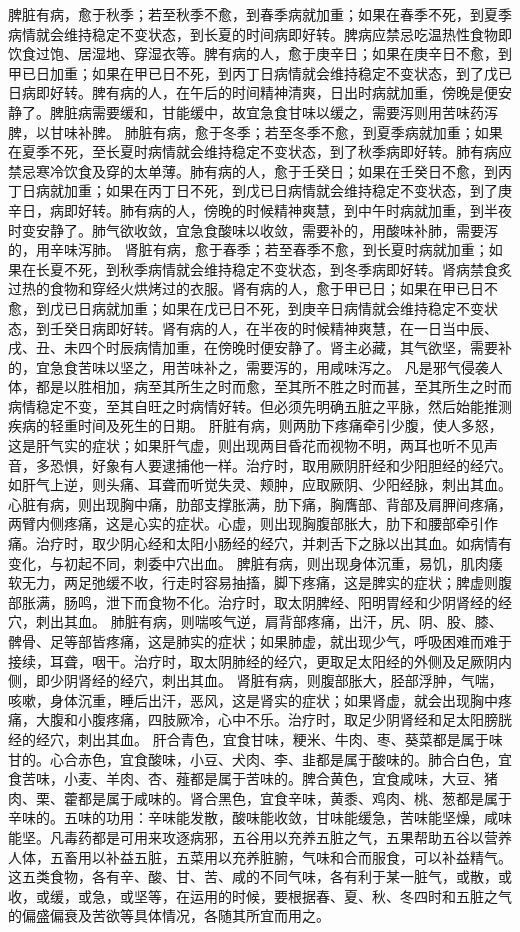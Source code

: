 \documentclass[a4paper,12pt,UTF8,twoside]{ctexbook}
\begin{document}
脾脏有病，愈于秋季；若至秋季不愈，到春季病就加重；如果在春季不死，到夏季病情就会维持稳定不变状态，到长夏的时间病即好转。脾病应禁忌吃温热性食物即饮食过饱、居湿地、穿湿衣等。脾有病的人，愈于庚辛日；如果在庚辛日不愈，到甲已日加重；如果在甲已日不死，到丙丁日病情就会维持稳定不变状态，到了戊已日病即好转。脾有病的人，在午后的时间精神清爽，日出时病就加重，傍晚是便安静了。脾脏病需要缓和，甘能缓中，故宜急食甘味以缓之，需要泻则用苦味药泻脾，以甘味补脾。
肺脏有病，愈于冬季；若至冬季不愈，到夏季病就加重；如果在夏季不死，至长夏时病情就会维持稳定不变状态，到了秋季病即好转。肺有病应禁忌寒冷饮食及穿的太单薄。肺有病的人，愈于壬癸日；如果在壬癸日不愈，到丙丁日病就加重；如果在丙丁日不死，到戊已日病情就会维持稳定不变状态，到了庚辛日，病即好转。肺有病的人，傍晚的时候精神爽慧，到中午时病就加重，到半夜时变安静了。肺气欲收敛，宜急食酸味以收敛，需要补的，用酸味补肺，需要泻的，用辛味泻肺。
肾脏有病，愈于春季；若至春季不愈，到长夏时病就加重；如果在长夏不死，到秋季病情就会维持稳定不变状态，到冬季病即好转。肾病禁食炙过热的食物和穿经火烘烤过的衣服。肾有病的人，愈于甲已日；如果在甲已日不愈，到戊已日病就加重；如果在戊已日不死，到庚辛日病情就会维持稳定不变状态，到壬癸日病即好转。肾有病的人，在半夜的时候精神爽慧，在一日当中辰、戌、丑、未四个时辰病情加重，在傍晚时便安静了。肾主必藏，其气欲坚，需要补的，宜急食苦味以坚之，用苦味补之，需要泻的，用咸味泻之。
凡是邪气侵袭人体，都是以胜相加，病至其所生之时而愈，至其所不胜之时而甚，至其所生之时而病情稳定不变，至其自旺之时病情好转。但必须先明确五脏之平脉，然后始能推测疾病的轻重时间及死生的日期。
肝脏有病，则两肋下疼痛牵引少腹，使人多怒，这是肝气实的症状；如果肝气虚，则出现两目昏花而视物不明，两耳也听不见声音，多恐惧，好象有人要逮捕他一样。治疗时，取用厥阴肝经和少阳胆经的经穴。如肝气上逆，则头痛、耳聋而听觉失灵、颊肿，应取厥阴、少阳经脉，刺出其血。
心脏有病，则出现胸中痛，肋部支撑胀满，肋下痛，胸膺部、背部及肩胛间疼痛，两臂内侧疼痛，这是心实的症状。心虚，则出现胸腹部胀大，肋下和腰部牵引作痛。治疗时，取少阴心经和太阳小肠经的经穴，并刺舌下之脉以出其血。如病情有变化，与初起不同，刺委中穴出血。
脾脏有病，则出现身体沉重，易饥，肌肉痿软无力，两足弛缓不收，行走时容易抽搐，脚下疼痛，这是脾实的症状；脾虚则腹部胀满，肠鸣，泄下而食物不化。治疗时，取太阴脾经、阳明胃经和少阴肾经的经穴，刺出其血。
肺脏有病，则喘咳气逆，肩背部疼痛，出汗，尻、阴、股、膝、髀骨、足等部皆疼痛，这是肺实的症状；如果肺虚，就出现少气，呼吸困难而难于接续，耳聋，咽干。治疗时，取太阴肺经的经穴，更取足太阳经的外侧及足厥阴内侧，即少阴肾经的经穴，刺出其血。
肾脏有病，则腹部胀大，胫部浮肿，气喘，咳嗽，身体沉重，睡后出汗，恶风，这是肾实的症状；如果肾虚，就会出现胸中疼痛，大腹和小腹疼痛，四肢厥冷，心中不乐。治疗时，取足少阴肾经和足太阳膀胱经的经穴，刺出其血。
肝合青色，宜食甘味，粳米、牛肉、枣、葵菜都是属于味甘的。心合赤色，宜食酸味，小豆、犬肉、李、韭都是属于酸味的。肺合白色，宜食苦味，小麦、羊肉、杏、薤都是属于苦味的。脾合黄色，宜食咸味，大豆、猪肉、栗、藿都是属于咸味的。肾合黑色，宜食辛味，黄黍、鸡肉、桃、葱都是属于辛味的。五味的功用：辛味能发散，酸味能收敛，甘味能缓急，苦味能坚燥，咸味能坚。凡毒药都是可用来攻逐病邪，五谷用以充养五脏之气，五果帮助五谷以营养人体，五畜用以补益五脏，五菜用以充养脏腑，气味和合而服食，可以补益精气。这五类食物，各有辛、酸、甘、苦、咸的不同气味，各有利于某一脏气，或散，或收，或缓，或急，或坚等，在运用的时候，要根据春、夏、秋、冬四时和五脏之气的偏盛偏衰及苦欲等具体情况，各随其所宜而用之。
\end{document}
